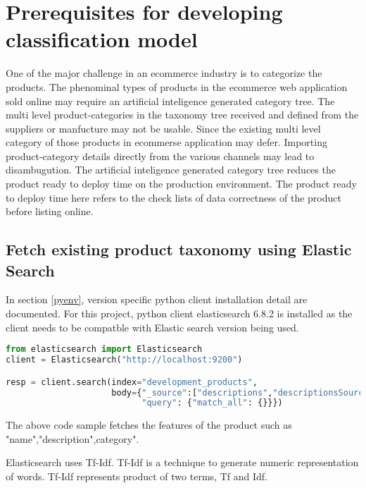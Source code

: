 
\chapter{Prerequisites for developing classification model}

One of the major challenge in an ecommerce industry is to categorize the products. The phenominal types of products in the ecommerce web application sold online may require an artificial inteligence generated category tree. The multi level product-categories in the taxonomy tree received and defined from the suppliers or manfucture may not be usable. Since the existing multi level category of those products in ecommerse application may defer. Importing product-category details directly from the various channels may lead to disambugution. The artificial inteligence generated category tree reduces the product ready to deploy time on the production environment. The product ready to deploy time here refers to the check lists of data correctness of the product before listing online.

\section {Fetch existing product taxonomy using Elastic Search}

In section \ref {pyenv}, version specific python client installation detail are documented. For this project, python client elasticsearch 6.8.2 is installed as the client needs to be compatble with Elastic search version being used.


\begin{lstlisting}[language=Python]
from elasticsearch import Elasticsearch
client = Elasticsearch("http://localhost:9200")

resp = client.search(index="development_products",
                     body={"_source":["descriptions","descriptionsSource","nameSource","shortDescriptionSource","categoriesSource"],
                           "query": {"match_all": {}}})
\end{lstlisting}

The above code sample fetches the features of the product such as "name","description",category".


Elasticsearch uses \acf{Tf-Idf}. \acs{Tf-Idf} is a technique to generate numeric representation of words. \acs{Tf-Idf} represents product of two terms, \acs{Tf} and \acs{Idf}.


